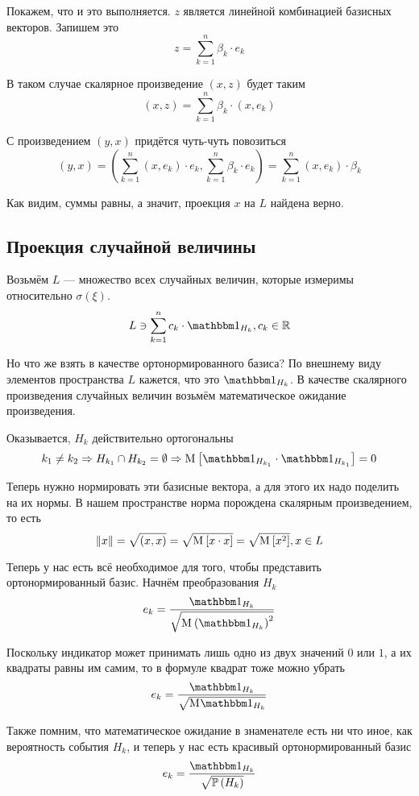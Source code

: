 Покажем, что и это выполняется.
$z$ является линейной комбинацией базисных векторов. Запишем это
$$z = \sum_{k=1}^n \beta_k\cdot e_k$$

В таком случае скалярное произведение $\left( x,z \right)$ будет таким
$$\left( x,z \right)=\sum_{k=1}^n \beta_k\cdot \left( x,e_k \right)$$

С произведением $\left( y,x \right)$ придётся чуть-чуть повозиться
$$\left( y,x \right)
    =\left( \sum_{k=1}^n\left( x,e_k \right)\cdot e_k,
        \sum_{k=1}^n \beta_k\cdot e_k \right)
    =\sum_{k=1}^n \left( x,e_k \right)\cdot\beta_k$$

Как видим, суммы равны, а значит, проекция $x$ на $L$ найдена верно.

\subsection{Проекция случайной величины}
Возьмём $L$ --- множество всех случайных величин, которые
измеримы относительно $\sigma\left( \xi \right)$.
$$L \ni \sum_{k=1}^n c_k \cdot \indicatorof{H_k}, c_k \in \mathbb{R}$$

Но что же взять в качестве ортонормированного базиса?
По внешнему виду элементов пространства $L$ кажется,
что это $\indicatorof{H_k}$.
В качестве скалярного произведения случайных величин
возьмём математическое ожидание произведения.

Оказывается, $H_k$ действительно ортогональны
$$k_1 \neq k_2
    \Rightarrow H_{k_1} \cap H_{k_2} = \emptyset
    \Rightarrow
    \Mean{ \indicatorof{H_{k_1}}\cdot \indicatorof{H_{k_1}} } = 0$$

Теперь нужно нормировать эти базисные вектора,
а для этого их надо поделить на их нормы.
В нашем пространстве норма порождена скалярным произведением,
то есть
$$\left\| x \right\| = \sqrt{\left( x,x \right)}
    = \sqrt{\mathrm{M}_{} \left[  x \cdot x  \right]}
    = \sqrt{\mathrm{M}_{} \left[  x^2  \right]}, x \in L$$

Теперь у нас есть всё необходимое для того,
чтобы представить ортонормированный базис.
Начнём преобразования $H_k$
$$e_k = \frac{\indicatorof{H_k}}
    {\sqrt{\mean{\left( \indicatorof{H_k} \right)^2}}}$$

Поскольку индикатор может принимать лишь одно из двух значений $0$ или $1$,
а их квадраты равны им самим, то в формуле квадрат тоже можно убрать
$$e_k = \frac{\indicatorof{H_k}}{\sqrt{\mean{\indicatorof{H_k}}}}$$

Также помним, что математическое ожидание в знаменателе есть ни что иное,
как вероятность события $H_k$,
и теперь у нас есть красивый ортонормированный базис
\begin{equation}\label{orthonormalBasis}
e_k = \frac{\indicatorof{H_k}}{\sqrt{\probability{H_k}}}
\end{equation}


